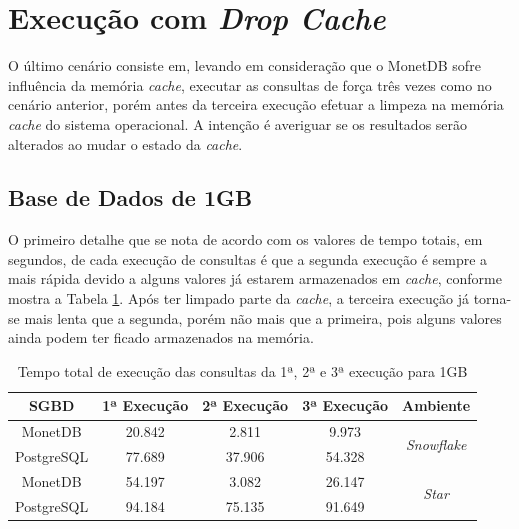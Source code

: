 \section{Execução com \textit{Drop Cache}}

O último cenário consiste em, levando em consideração que o MonetDB sofre influência da memória \textit{cache}, executar as consultas de força três vezes como no cenário anterior, porém antes da terceira execução efetuar a limpeza na memória \textit{cache} do sistema operacional. A intenção é averiguar se os resultados serão alterados ao mudar o estado da \textit{cache}.

\subsection{Base de Dados de 1GB}

O primeiro detalhe que se nota de acordo com os valores de tempo totais, em segundos, de cada execução de consultas é que a segunda execução é sempre a mais rápida devido a alguns valores já estarem armazenados em \textit{cache}, conforme mostra a Tabela \ref{tab:queries_cache_1}. Após ter limpado parte da \textit{cache}, a terceira execução já torna-se mais lenta que a segunda, porém não mais que a primeira, pois alguns valores ainda podem ter ficado armazenados na memória.

\begin{table}[htpb]
        \centering
        \caption{Tempo total de execução das consultas da 1ª, 2ª e 3ª execução para 1GB}
        \label{tab:queries_cache_1}
        \begin{tabular}{|c|c|c|c|c|}
        \hline
        SGBD       & 1ª Execução & 2ª Execução & 3ª Execução & Ambiente                            \\ \hline
        MonetDB    & 20.842      & 2.811       & 9.973       & \multirow{2}{*}{\textit{Snowflake}} \\ \cline{1-4}
        PostgreSQL & 77.689      & 37.906      & 54.328      &                                     \\ \hline
        MonetDB    & 54.197      & 3.082       & 26.147      & \multirow{2}{*}{\textit{Star}}      \\ \cline{1-4}
        PostgreSQL & 94.184      & 75.135      & 91.649      &                                     \\ \hline
        \end{tabular}
\end{table}

